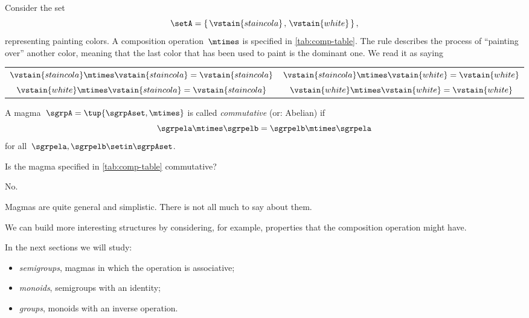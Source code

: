 \begin{example}
    Consider the set
    \begin{equation*}
        \setA = \left\{\hspace{0.05cm} \vstain{staincola}\hspace{0.05cm},\hspace{0.05cm} \vstain{white}\hspace{0.05cm}\right\},
    \end{equation*}
    representing painting colors.
    A composition operation~$\mtimes$ is specified in \cref{tab:comp-table}.
    The rule describes the process of ``painting over'' another color, meaning that the last color that has been used to paint is the dominant one.
    We read it as saying
    \begin{center}
        \setlength{\tabcolsep}{20pt}
        \begin{tabular}{cc}
            $\vstain{staincola} \mtimes \vstain{staincola} = \vstain{staincola}$ & $\vstain{staincola} \mtimes \vstain{white} = \vstain{white}$ \\
            $\vstain{white} \mtimes \vstain{staincola}     = \vstain{staincola}$ & $\vstain{white} \mtimes \vstain{white} = \vstain{white}$
        \end{tabular}
    \end{center}
\end{example}

\begin{definition}
    \label{def:magma-commutativity}
    A magma~$\sgrpA = \tup{\sgrpAset, \mtimes}$ is called \emph{commutative} (or: Abelian) if
    \begin{equation}
        \label{eq:semigroup-commutativity}
        \sgrpela \mtimes   \sgrpelb = \sgrpelb \mtimes \sgrpela
    \end{equation}
    for all~$\sgrpela , \sgrpelb \setin \sgrpAset$.
\end{definition}

\begin{exercise}
    Is the magma specified in \cref{tab:comp-table} commutative?
\end{exercise}
\begin{solution}
    No.
\end{solution}

Magmas are quite general and simplistic.
There is not all much to say about them.

We can build more interesting structures by considering, for example, properties that the composition operation might have.

In the next sections we will study:

\begin{itemize}
    \item \emph{semigroups}, magmas in which the operation is associative;
    \item \emph{monoids}, semigroups with an identity;
    \item \emph{groups}, monoids with an inverse operation.
\end{itemize}

